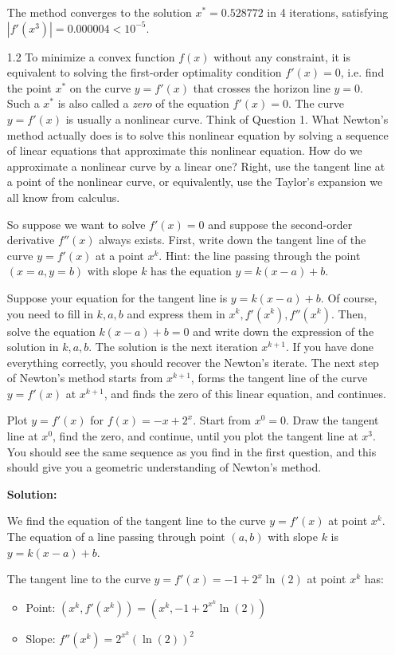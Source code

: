 \documentclass{article}
\begin{document}
\begin{enumerate}
    The method converges to the solution $x^* = 0.528772$ in 4 iterations, satisfying $|f'(x^3)| = 0.000004 < 10^{-5}$.
    
    \item[1.2] To minimize a convex function $f(x)$ without any constraint, it is equivalent to solving the first-order optimality condition $f'(x)=0$, i.e. find the point $x^*$ on the curve $y=f'(x)$ that crosses the horizon line $y=0$. Such a $x^*$ is also called a \emph{zero} of the equation $f'(x)=0$. The curve $y=f'(x)$ is usually a nonlinear curve. Think of Question 1. What Newton's method actually does is to solve this nonlinear equation by solving a sequence of linear equations that approximate this nonlinear equation. How do we approximate a nonlinear curve by a linear one? Right, use the tangent line at a point of the nonlinear curve, or equivalently, use the Taylor's expansion we all know from calculus. 
    
    So suppose we want to solve $f'(x)=0$ and suppose the second-order derivative $f''(x)$ always exists. First, write down the tangent line of the curve $y=f'(x)$ at a point $x^k$. Hint: the line passing through the point $(x=a,y=b)$ with slope $k$ has the equation $y=k(x-a)+b$. 
    
    Suppose your equation for the tangent line is $y=k(x-a)+b$. Of course, you need to fill in $k,a,b$ and express them in $x^k, f'(x^k), f''(x^k)$. Then, solve the equation $k(x-a)+b=0$ and write down the expression of the solution in $k,a,b$. The solution is the next iteration $x^{k+1}$. If you have done everything correctly, you should recover the Newton's iterate. The next step of Newton's method starts from $x^{k+1}$, forms the tangent line of the curve $y=f'(x)$ at $x^{k+1}$, and finds the zero of this linear equation, and continues.
    
    Plot $y=f'(x)$ for $f(x)=-x + 2^x$. Start from $x^0=0$. Draw the tangent line at $x^0$, find the zero, and continue, until you plot the tangent line at $x^3$. You should see the same sequence as you find in the first question, and this should give you a geometric understanding of Newton's method.
    
    \textbf{Solution:}
    
    We find the equation of the tangent line to the curve $y=f'(x)$ at point $x^k$. The equation of a line passing through point $(a,b)$ with slope $k$ is $y=k(x-a)+b$.
    
    The tangent line to the curve $y=f'(x) = -1 + 2^x \ln(2)$ at point $x^k$ has:
    \begin{itemize}
    \item Point: $(x^k, f'(x^k)) = (x^k, -1 + 2^{x^k} \ln(2))$
    \item Slope: $f''(x^k) = 2^{x^k} (\ln(2))^2$
    \end{itemize}
    

\end{enumerate}
\end{document}
